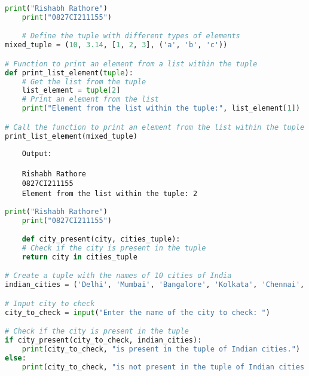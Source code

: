 \documentclass{report}
\begin{document}


\newpage


\sol 
\begin{lstlisting}[language=Python]
	print("Rishabh Rathore")
	print("0827CI211155")

	# Define the tuple with different types of elements
mixed_tuple = (10, 3.14, [1, 2, 3], ('a', 'b', 'c'))

# Function to print an element from a list within the tuple
def print_list_element(tuple):
    # Get the list from the tuple
    list_element = tuple[2]
    # Print an element from the list
    print("Element from the list within the tuple:", list_element[1])

# Call the function to print an element from the list within the tuple
print_list_element(mixed_tuple)
\end{lstlisting}

\begin{verbatim}
	Output:

	Rishabh Rathore
	0827CI211155
	Element from the list within the tuple: 2

\end{verbatim}


\newpage


\sol 
\begin{lstlisting}[language=Python]
	print("Rishabh Rathore")
	print("0827CI211155")

	def city_present(city, cities_tuple):
    # Check if the city is present in the tuple
    return city in cities_tuple

# Create a tuple with the names of 10 cities of India
indian_cities = ('Delhi', 'Mumbai', 'Bangalore', 'Kolkata', 'Chennai', 'Hyderabad', 'Pune', 'Ahmedabad', 'Jaipur', 'Lucknow')

# Input city to check
city_to_check = input("Enter the name of the city to check: ")

# Check if the city is present in the tuple
if city_present(city_to_check, indian_cities):
    print(city_to_check, "is present in the tuple of Indian cities.")
else:
    print(city_to_check, "is not present in the tuple of Indian cities.")
\end{lstlisting}
\end{document}
